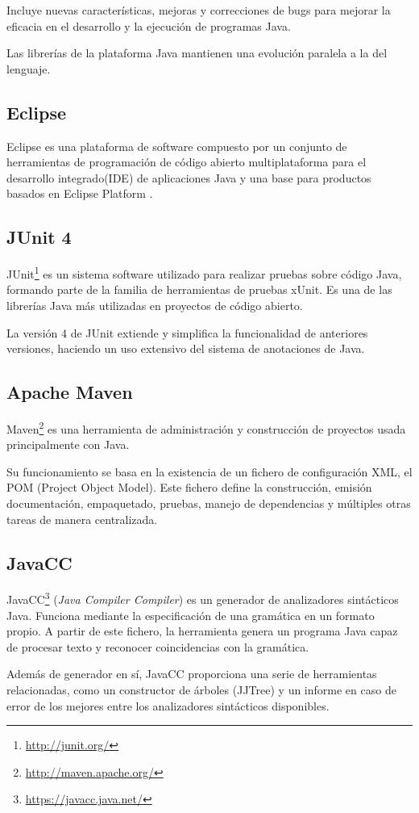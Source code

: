  Incluye nuevas características, mejoras y correcciones de bugs para mejorar la eficacia en el desarrollo y la ejecución de programas Java. 
 
 Las librerías de la plataforma Java mantienen una evolución paralela a la del lenguaje.
\subsection{Eclipse}
Eclipse es una plataforma de software compuesto por un conjunto de herramientas de programación de código abierto multiplataforma para el desarrollo integrado(IDE) de aplicaciones Java  y una base para productos basados en Eclipse Platform .


\subsection{JUnit 4}
JUnit\footnote{\url{http://junit.org/}} es un sistema software utilizado para realizar pruebas sobre código Java, formando parte de la familia de herramientas de pruebas xUnit.
Es una de las librerías Java más utilizadas en proyectos de código abierto.

La versión 4 de JUnit extiende y simplifica la funcionalidad de anteriores versiones, haciendo un uso extensivo del sistema de anotaciones de Java.
\subsection{Apache Maven}
Maven\footnote{\url{http://maven.apache.org/}} es una herramienta de administración y construcción de proyectos usada principalmente con Java.

Su funcionamiento se basa en la existencia de un fichero de configuración XML, el POM (Project Object Model).
Este fichero define la construcción, emisión documentación, empaquetado, pruebas, manejo de dependencias y múltiples otras tareas de manera centralizada.
\subsection{JavaCC}
JavaCC\footnote{\url{https://javacc.java.net/}} (\emph{Java Compiler Compiler}) es un generador de analizadores sintácticos Java.
Funciona mediante la especificación de una gramática en un formato propio.
A partir de este fichero, la herramienta genera un programa Java capaz de procesar texto y reconocer coincidencias con la gramática.

Además de generador en sí, JavaCC proporciona una serie de herramientas relacionadas, como un constructor de árboles (JJTree) y un informe en caso de error de los mejores entre los analizadores sintácticos disponibles.
